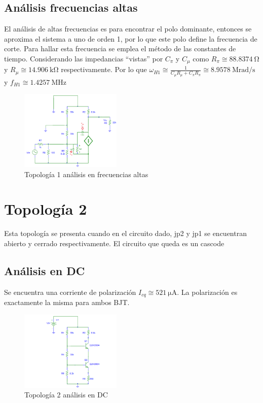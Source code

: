 \documentclass[letterpaper, 10 pt, conference]{ieeeconf}  %
\begin{document}
\subsection{Análisis frecuencias altas}
El análisis de altas frecuencias es para encontrar el polo dominante, entonces se aproxima el sistema a uno de orden 1, por lo que este polo define la frecuencia de corte. Para hallar esta frecuencia se emplea el método de las constantes de tiempo. Considerando las impedancias ``vistas'' por $C_{\pi}$ y $C_{\mu}$ como $R_{\pi} \cong \qty{88.8374}{\ohm}$ y $R_{\mu} \cong \qty{14.906}{\kilo\ohm}$ respectivamente. Por lo que $\omega_{H1} \cong \frac{1}{ C_{\mu}R_{\mu} + C_{\pi}R_{\pi} } \cong \qty{8.9578}{\mega\radian\per\second}$ y $f_{H1} \cong \qty{1.4257}{\mega\hertz}$

\begin{figure}[H]
 \centering
 \includegraphics[width=0.43\textwidth]{./Imagenes/topologia1_fa.png}
 \caption{Topología 1 análisis en frecuencias altas}
\end{figure}

\section{Topología 2}
Esta topología se presenta cuando en el circuito dado, jp2 y jp1 se encuentran abierto y cerrado respectivamente. El circuito que queda es un cascode
\subsection{Análisis en DC}
Se encuentra una corriente de polarización $I_{cq} \cong \qty{521}{\micro\ampere}$. La polarización es exactamente la misma para ambos BJT.

\begin{figure}[H]
 \centering
 \includegraphics[width=0.43\textwidth]{./Imagenes/topologia2_dc.png}
 \caption{Topología 2 análisis en DC}
\end{figure}
\end{document}
